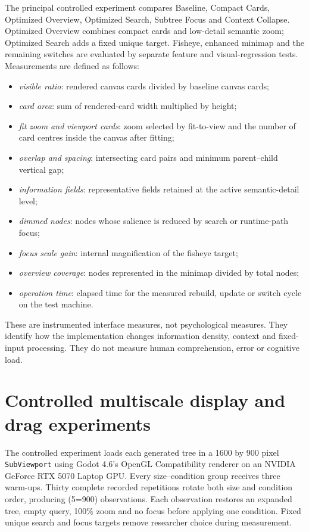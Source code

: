 The principal controlled experiment compares Baseline, Compact Cards, Optimized Overview, Optimized Search, Subtree Focus and Context Collapse. Optimized Overview combines compact cards and low-detail semantic zoom; Optimized Search adds a fixed unique target. Fisheye, enhanced minimap and the remaining switches are evaluated by separate feature and visual-regression tests. Measurements are defined as follows:

\begin{itemize}
    \item \emph{visible ratio}: rendered canvas cards divided by baseline canvas cards;
    \item \emph{card area}: sum of rendered-card width multiplied by height;
    \item \emph{fit zoom and viewport cards}: zoom selected by fit-to-view and the number of card centres inside the canvas after fitting;
    \item \emph{overlap and spacing}: intersecting card pairs and minimum parent--child vertical gap;
    \item \emph{information fields}: representative fields retained at the active semantic-detail level;
    \item \emph{dimmed nodes}: nodes whose salience is reduced by search or runtime-path focus;
    \item \emph{focus scale gain}: internal magnification of the fisheye target;
    \item \emph{overview coverage}: nodes represented in the minimap divided by total nodes;
    \item \emph{operation time}: elapsed time for the measured rebuild, update or switch cycle on the test machine.
\end{itemize}

These are instrumented interface measures, not psychological measures. They identify how the implementation changes information density, context and fixed-input processing. They do not measure human comprehension, error or cognitive load.

\section{Controlled multiscale display and drag experiments}

The controlled experiment loads each generated tree in a 1600 by 900 pixel \texttt{SubViewport} using Godot 4.6's OpenGL Compatibility renderer on an NVIDIA GeForce RTX 5070 Laptop \ac{GPU}. Every size--condition group receives three warm-ups. Thirty complete recorded repetitions rotate both size and condition order, producing (5=900) observations. Each observation restores an expanded tree, empty query, 100\% zoom and no focus before applying one condition. Fixed unique search and focus targets remove researcher choice during measurement.

